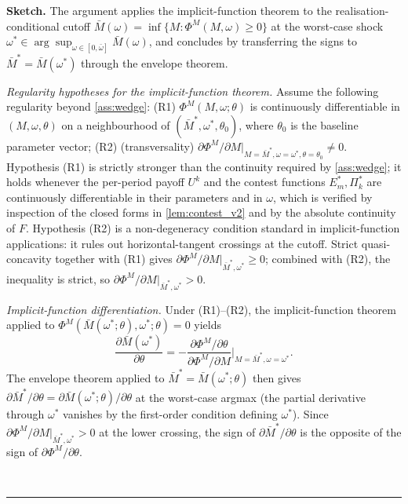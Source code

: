 \documentclass[11pt,twoside]{extarticle}
\newenvironment{proof}[1][Proof]{\noindent \textbf{#1.} }{\ \rule{0.5em}{0.5em}}
\begin{document}
\begin{proof}[Sketch]
The argument applies the implicit-function theorem to the realisation-conditional cutoff $\bar M(\omega)=\inf\{M:\Phi^M(M,\omega)\ge 0\}$ at the worst-case shock $\omega^*\in\arg\sup_{\omega\in[0,\bar\omega]}\bar M(\omega)$, and concludes by transferring the signs to $\bar M^*=\bar M(\omega^*)$ through the envelope theorem.

\textit{Regularity hypotheses for the implicit-function theorem.}
Assume the following regularity beyond \autoref{ass:wedge}:
(R1) $\Phi^M(M, \omega; \theta)$ is continuously differentiable in $(M, \omega, \theta)$
on a neighbourhood of $(\bar M^*, \omega^*, \theta_0)$, where $\theta_0$ is the
baseline parameter vector;
(R2) (transversality) $\partial \Phi^M / \partial M\big|_{M = \bar M^*, \omega = \omega^*, \theta = \theta_0} \neq 0$.
Hypothesis (R1) is strictly stronger than the continuity required by
\autoref{ass:wedge}; it holds whenever the per-period payoff $U^k$ and
the contest functions $E_m^*, \Pi_k^*$ are continuously differentiable
in their parameters and in $\omega$, which is verified by inspection of the closed
forms in \autoref{lem:contest_v2} and by the absolute continuity of $F$. Hypothesis (R2) is a non-degeneracy
condition standard in implicit-function applications: it rules out
horizontal-tangent crossings at the cutoff. Strict quasi-concavity together with (R1) gives
$\partial \Phi^M / \partial M\big|_{\bar M^*, \omega^*} \ge 0$; combined with (R2),
the inequality is strict, so $\partial \Phi^M / \partial M\big|_{\bar M^*, \omega^*} > 0$.

\textit{Implicit-function differentiation.} Under (R1)--(R2),
the implicit-function theorem applied to $\Phi^M(\bar M(\omega^*;\theta), \omega^*; \theta) = 0$
yields
\[
\frac{\partial \bar M(\omega^*)}{\partial \theta} = -\frac{\partial \Phi^M / \partial \theta}{\partial \Phi^M / \partial M}\bigg|_{M = \bar M^*, \omega = \omega^*}.
\]
The envelope theorem applied to $\bar M^*=\bar M(\omega^*;\theta)$ then gives $\partial\bar M^*/\partial\theta=\partial\bar M(\omega^*;\theta)/\partial\theta$ at the worst-case argmax (the partial derivative through $\omega^*$ vanishes by the first-order condition defining $\omega^*$). Since $\partial \Phi^M / \partial M\big|_{\bar M^*, \omega^*} > 0$ at the lower
crossing, the sign of $\partial \bar M^* / \partial \theta$ is the
opposite of the sign of $\partial \Phi^M / \partial \theta$.


\end{proof}
\end{document}
